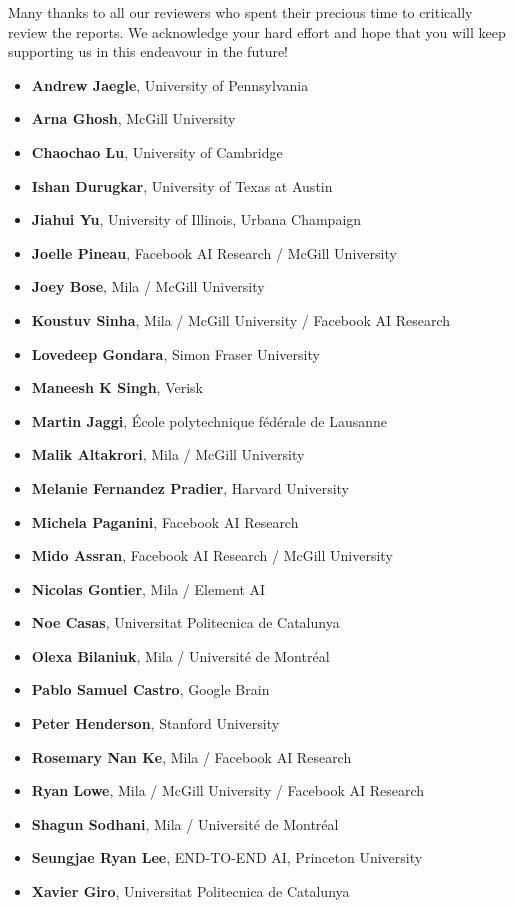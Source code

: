 Many thanks to all our reviewers who spent their precious time to critically review the reports. We acknowledge your hard effort and hope that you will keep supporting us in this endeavour in the future!  

\begin{itemize}
    \item \textbf{Andrew Jaegle}, University of Pennsylvania
    \item \textbf{Arna Ghosh}, McGill University
    \item \textbf{Chaochao Lu}, University of Cambridge
    \item \textbf{Ishan Durugkar}, University of Texas at Austin
    \item \textbf{Jiahui Yu}, University of Illinois, Urbana Champaign
    \item \textbf{Joelle Pineau}, Facebook AI Research / McGill University
    \item \textbf{Joey Bose}, Mila / McGill University
    \item \textbf{Koustuv Sinha}, Mila / McGill University / Facebook AI Research
    \item \textbf{Lovedeep Gondara}, Simon Fraser University
    \item \textbf{Maneesh K Singh}, Verisk
    \item \textbf{Martin Jaggi}, École polytechnique fédérale de Lausanne
    \item \textbf{Malik Altakrori}, Mila / McGill University
    \item \textbf{Melanie Fernandez Pradier}, Harvard University
    \item \textbf{Michela Paganini}, Facebook AI Research
    \item \textbf{Mido Assran}, Facebook AI Research / McGill University
    \item \textbf{Nicolas Gontier}, Mila / Element AI
    \item \textbf{Noe Casas}, Universitat Politecnica de Catalunya
    \item \textbf{Olexa Bilaniuk}, Mila / Université de Montréal
    \item \textbf{Pablo Samuel Castro}, Google Brain
    \item \textbf{Peter Henderson}, Stanford University
    \item \textbf{Rosemary Nan Ke}, Mila / Facebook AI Research
    \item \textbf{Ryan Lowe}, Mila / McGill University / Facebook AI Research
    \item \textbf{Shagun Sodhani}, Mila / Université de Montréal
    \item \textbf{Seungjae Ryan Lee}, END-TO-END AI, Princeton University
    \item \textbf{Xavier Giro}, Universitat Politecnica de Catalunya
\end{itemize}

